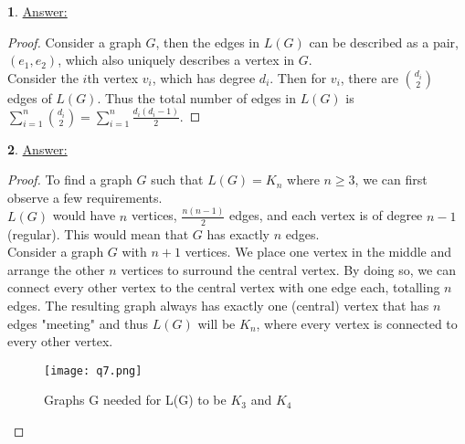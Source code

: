 \documentclass[12pt,a4paper]{article}
\theoremstyle{definition}
\newtheorem{problem}{}
\begin{document}
\begin{problem} \underline{Answer:}
\begin{proof}
Consider a graph $G$, then the edges in $L(G)$ can be described as a pair, $(e_1, e_2)$, which also uniquely describes a vertex in $G$. \\

Consider the $i$th vertex $v_i$, which has degree $d_i$. Then for $v_i$, there are $\binom{d_i}{2}$ edges of $L(G)$. Thus the total number of edges in $L(G)$ is \\

$\sum_{i = 1}^{n} \binom{d_i}{2} = \sum_{i = 1}^{n}\frac{d_i(d_i - 1)}{2}.$
\end{proof}
\end{problem}

\begin{problem} \underline{Answer:}
\begin{proof}
To find a graph $G$ such that $L(G) = K_n$ where $n \geq 3$, we can first observe a few requirements. \\

$L(G)$ would have $n$ vertices, $\frac{n(n - 1)}{2}$ edges, and each vertex is of degree $n - 1$ (regular). This would mean that $G$ has exactly $n$ edges. \\

Consider a graph $G$ with $n + 1$ vertices. We place one vertex in the middle and arrange the other $n$ vertices to surround the central vertex. By doing so, we can connect every other vertex to the central vertex with one edge each, totalling $n$ edges. The resulting graph always has exactly one (central) vertex that has $n$ edges "meeting" and thus $L(G)$ will be $K_n$, where every vertex is connected to every other vertex. \\

\begin{figure}[H]
    \centering
    \texttt{[image: q7.png]}
    \caption{Graphs G needed for L(G) to be $K_3$ and $K_4$}
    \label{fig:my_label}
\end{figure}

\end{proof}
\end{problem}
\end{document}
